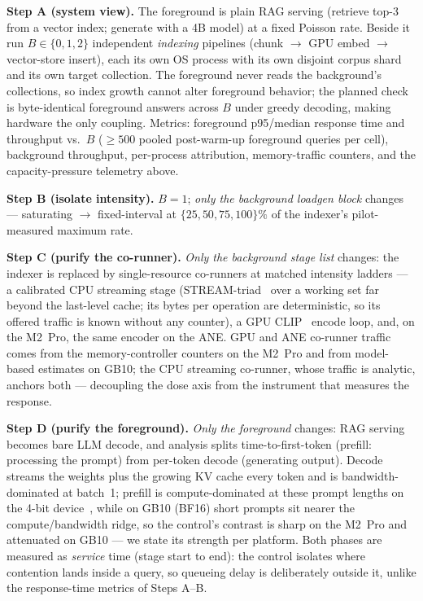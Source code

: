 \textbf{Step A (system view).} The foreground is plain RAG serving
(retrieve top-3 from a vector index; generate with a 4B model) at a fixed
Poisson rate. Beside it run $B \in \{0,1,2\}$ independent \emph{indexing}
pipelines (chunk $\rightarrow$ GPU embed $\rightarrow$ vector-store
insert), each its own OS process with its own disjoint corpus shard and its
own target collection. The foreground never reads the background's
collections, so index growth cannot alter foreground behavior; the planned
check is byte-identical foreground answers across $B$ under greedy
decoding, making hardware the only coupling. Metrics: foreground
p95/median response time and throughput vs.\ $B$ ($\geq 500$ pooled
post-warm-up foreground queries per cell), background throughput,
per-process attribution, memory-traffic counters, and the
capacity-pressure telemetry above.

\textbf{Step B (isolate intensity).} $B{=}1$; \emph{only the background
loadgen block} changes --- saturating $\rightarrow$ fixed-interval at
$\{25,50,75,100\}\%$ of the indexer's pilot-measured maximum rate.

\textbf{Step C (purify the co-runner).} \emph{Only the background stage
list} changes: the indexer is replaced by single-resource co-runners at
matched intensity ladders --- a calibrated CPU streaming stage
(STREAM-triad~\cite{mccalpin1995stream} over a working set far beyond the
last-level cache; its bytes per operation are deterministic, so its
offered traffic is known without any counter), a GPU
CLIP~\cite{radford2021clip} encode loop, and, on the M2~Pro, the same
encoder on the ANE. GPU and ANE co-runner traffic comes from the
memory-controller counters on the M2~Pro and from model-based estimates on
GB10; the CPU streaming co-runner, whose traffic is analytic, anchors
both --- decoupling the dose axis from the instrument that measures the
response.

\textbf{Step D (purify the foreground).} \emph{Only the foreground}
changes: RAG serving becomes bare LLM decode, and analysis splits
time-to-first-token (prefill: processing the prompt) from per-token decode
(generating output). Decode streams the weights plus the growing KV cache
every token and is bandwidth-dominated at batch~1; prefill is
compute-dominated at these prompt lengths on the 4-bit
device~\cite{patel2024splitwise,agrawal2024sarathi}, while on GB10 (BF16)
short prompts sit nearer the compute/bandwidth ridge, so the control's
contrast is sharp on the M2~Pro and attenuated on GB10 --- we state its
strength per platform. Both phases are measured as \emph{service} time
(stage start to end): the control isolates where contention lands inside a
query, so queueing delay is deliberately outside it, unlike the
response-time metrics of Steps A--B.


